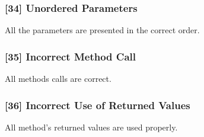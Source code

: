 \subsubsection{[34] Unordered Parameters}
All the parameters are presented in the correct order.


\subsubsection{[35] Incorrect Method Call}
All methods calls are correct.


\subsubsection{[36] Incorrect Use of Returned Values}
All method's returned values are used properly.


